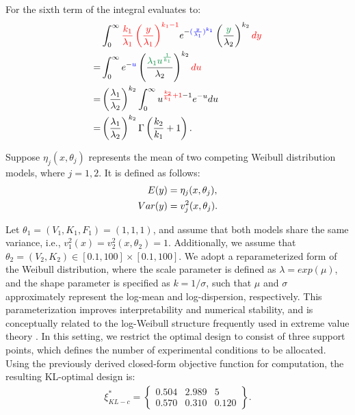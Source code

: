 For the sixth term of the integral evaluates to:
\begin{align*}
&\int_{0}^{\infty}\textcolor{red}{\frac{k_1}{\lambda_1} \left(\frac{y}{\lambda_1}\right)^{k_1-1}} e^{-\textcolor{blue}{(\frac{y}{\lambda_1})^{k_1}}}\left(\frac{\textcolor{PowerPointGreen}{y}}{\lambda_2}\right)^{k_2} \textcolor{red}{dy}\\
=&\int_{0}^{\infty}e^{-\textcolor{blue}{u}}\left(\frac{\textcolor{PowerPointGreen}{\lambda_1u^{\frac{1}{k_1}}}}{\lambda_2}\right)^{k_2} \textcolor{red}{du}\\
=&\left(\frac{\lambda_1}{\lambda_2}\right)^{k_2}\int_{0}^{\infty}u^{\textcolor{red}{\frac{k_2}{k_1}+1}-1}e^{-u} du\\
=&\left(\frac{\lambda_1}{\lambda_2}\right)^{k_2}\Gamma\left(\frac{k_2}{k_1}+1\right).
\end{align*}

Suppose $\eta_j(x,\theta_j)$ represents the mean of two competing Weibull distribution models, where $j=1,2$. It is defined as follows:
\begin{align}
E(y)&=\eta_j(x,\theta_j),\notag \\
Var(y)&=v^2_j(x,\theta_j).\notag
\end{align}

\hspace*{8mm} Let $\theta_1=(V_1,K_1,F_1)=(1,1,1)$,  and assume that both models share the same variance, i.e., $v^2_1(x)=v^2_2(x,\theta_2)=1$. Additionally, we assume that $\theta_2=(V_2,K_2) \in [0.1,100] \times [0.1,100]$. We adopt a reparameterized form of the Weibull distribution, where the scale parameter is defined as $\lambda=exp(\mu)$, and the shape parameter is specified as $k=1/\sigma$, such that $\mu$ and $\sigma$ approximately represent the log-mean and log-dispersion, respectively. This parameterization improves interpretability and numerical stability, and is conceptually related to the log-Weibull structure frequently used in extreme value theory \citep{coles2001introduction}. In this setting, we restrict the optimal design to consist of three support points, which defines the number of experimental conditions to be allocated. Using the previously derived closed-form objective function for computation, the resulting KL-optimal design is:
\begin{align*}
\xi^*_{KL-c} = \left\{\begin{array}{ccc}
0.504 & 2.989 & 5 \\
0.570 & 0.310 & 0.120
\end{array}\right\}.
\end{align*}

